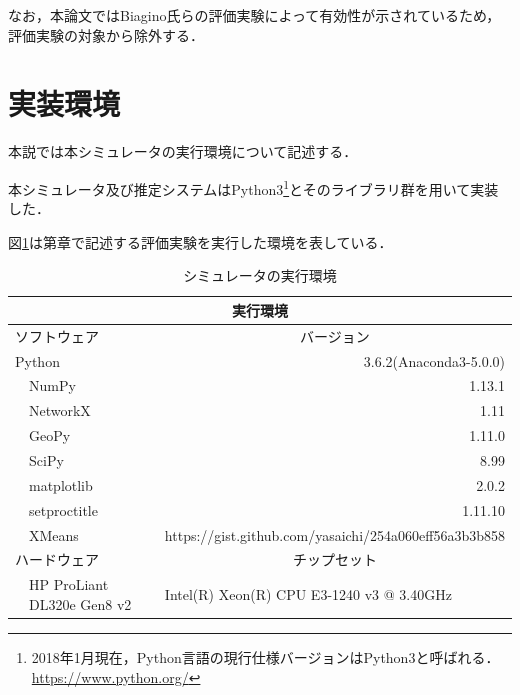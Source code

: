 なお，本論文ではBiagino氏らの評価実験\cite{Biagioni}によって有効性が示されているため，評価実験の対象から除外する．

\section{実装環境}
本説では本シミュレータの実行環境について記述する．

本シミュレータ及び推定システムはPython3\footnote{2018年1月現在，Python言語の現行仕様バージョンはPython3と呼ばれる．\url{https://www.python.org/}}とそのライブラリ群を用いて実装した．

図\ref{exec-enviroment}は第\label{evaluation}章で記述する評価実験を実行した環境を表している．
\begin{table}[htbp]
	\centering
	\begin{tabular}{llr}
		\hline
		\multicolumn{3}{c}{実行環境}                                                                               \\ \hline
		\multicolumn{2}{l}{ソフトウェア} & \multicolumn{1}{c}{バージョン}                                                 \\ \hline
		\multicolumn{2}{l}{Python} & 3.6.2(Anaconda3-5.0.0)                                                    \\
		  & NumPy \protect \footnotemark[5]                                                        & 1.13.1                                                                    \\
		  & NetworkX \protect \footnotemark[6]   & 1.11                                                                      \\
		  & GeoPy \protect \footnotemark[7]  & 1.11.0                                                                    \\
		  & SciPy \protect \footnotemark[8]                                                                                    & 8.99                                                                      \\
		  & matplotlib \protect \footnotemark[9]                                          & 2.0.2                                                                     \\
		  & setproctitle \protect \footnotemark[10]                            & 1.11.10                                                                   \\
		  & XMeans                                                                                                                                                        & \multicolumn{1}{l}{https://gist.github.com/yasaichi/254a060eff56a3b3b858} \\ \hline
		\multicolumn{2}{l}{ハードウェア} & \multicolumn{1}{c}{チップセット}                                                    \\ \hline
		  & HP ProLiant DL320e Gen8 v2                                                                                                                                    & \multicolumn{1}{l}{Intel(R) Xeon(R) CPU E3-1240 v3 @ 3.40GHz}             
	\end{tabular}
	\label{exec-enviroment}
	\caption{シミュレータの実行環境}
\end{table}
